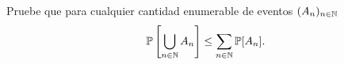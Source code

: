 \begin{statement}{1}
  Pruebe que para cualquier cantidad enumerable de eventos $(A_n)_{n \in \mathbb{N}}$
  \[
    \mathbb{P}\left[\bigcup_{n \in \mathbb{N}} A_n\right] \leq \sum_{n \in \mathbb{N}} \mathbb{P}[A_n].
  \]
\end{statement}